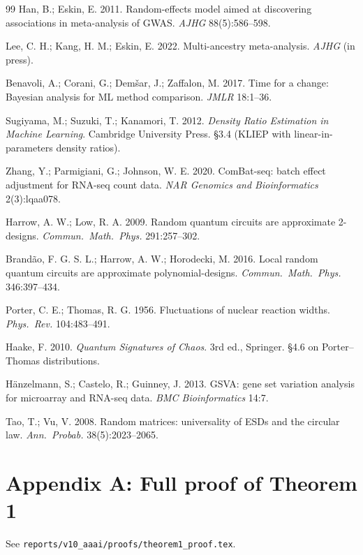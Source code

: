 \documentclass[letterpaper,11pt]{article}
\begin{document}
\begin{thebibliography}{99}
Han, B.; Eskin, E. 2011. Random-effects model aimed at discovering
 associations in meta-analysis of GWAS. \emph{AJHG} 88(5):586--598.

Lee, C. H.; Kang, H. M.; Eskin, E. 2022. Multi-ancestry meta-analysis.
 \emph{AJHG} (in press).

Benavoli, A.; Corani, G.; Dem\v{s}ar, J.; Zaffalon, M. 2017. Time
 for a change: Bayesian analysis for ML method comparison. \emph{JMLR}
 18:1--36.

Sugiyama, M.; Suzuki, T.; Kanamori, T. 2012. \emph{Density Ratio
 Estimation in Machine Learning}. Cambridge University Press.
 \S3.4 (KLIEP with linear-in-parameters density ratios).

Zhang, Y.; Parmigiani, G.; Johnson, W. E. 2020. ComBat-seq: batch
 effect adjustment for RNA-seq count data. \emph{NAR Genomics and
 Bioinformatics} 2(3):lqaa078.

Harrow, A. W.; Low, R. A. 2009. Random quantum circuits are
 approximate 2-designs. \emph{Commun.\ Math.\ Phys.} 291:257--302.

Brand\~ao, F. G. S. L.; Harrow, A. W.; Horodecki, M. 2016. Local
 random quantum circuits are approximate polynomial-designs.
 \emph{Commun.\ Math.\ Phys.} 346:397--434.

Porter, C. E.; Thomas, R. G. 1956. Fluctuations of nuclear reaction
 widths. \emph{Phys.\ Rev.} 104:483--491.

Haake, F. 2010. \emph{Quantum Signatures of Chaos}. 3rd ed., Springer.
 §4.6 on Porter--Thomas distributions.

H\"anzelmann, S.; Castelo, R.; Guinney, J. 2013. GSVA: gene set
 variation analysis for microarray and RNA-seq data. \emph{BMC
 Bioinformatics} 14:7.

Tao, T.; Vu, V. 2008. Random matrices: universality of ESDs and
 the circular law. \emph{Ann.\ Probab.} 38(5):2023--2065.
\end{thebibliography}

\appendix
\section{Appendix A: Full proof of Theorem 1}
See \texttt{reports/v10\_aaai/proofs/theorem1\_proof.tex}.
\end{document}
